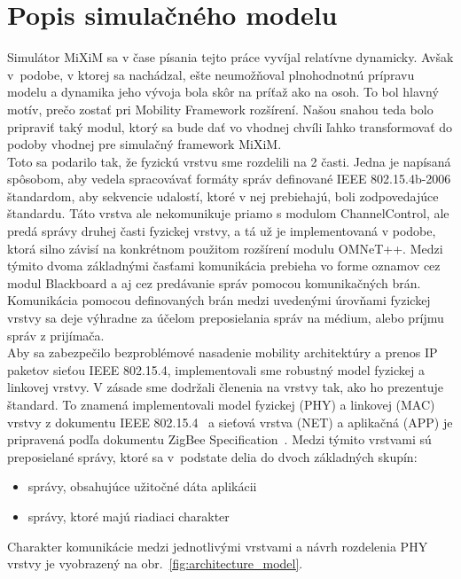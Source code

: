 \chapter{Popis simulačného modelu}
\indent\indent Simulátor MiXiM sa v čase písania tejto práce vyvíjal relatívne dynamicky. Avšak v~podobe, v ktorej sa nachádzal, ešte neumožňoval plnohodnotnú prípravu modelu a dynamika jeho vývoja bola skôr na príťaž ako na osoh. To bol hlavný motív, prečo zostať pri Mobility Framework rozšírení. Našou snahou teda bolo pripraviť taký modul, ktorý sa bude dať vo vhodnej chvíli ľahko transformovať do podoby vhodnej pre simulačný framework MiXiM.\\
\indent Toto sa podarilo tak, že fyzickú vrstvu sme rozdelili na 2 časti. Jedna je napísaná spôsobom, aby vedela spracovávať formáty správ definované IEEE 802.15.4b-2006 štandardom, aby sekvencie udalostí, ktoré v nej prebiehajú, boli zodpovedajúce štandardu. Táto vrstva ale nekomunikuje priamo s modulom \ttfamily ChannelControl\rmfamily, ale predá správy druhej časti fyzickej vrstvy, a tá už je implementovaná v podobe, ktorá silno závisí na konkrétnom použitom rozšírení modulu OMNeT++. Medzi týmito dvoma základnými časťami komunikácia prebieha vo forme oznamov cez modul \ttfamily Blackboard \rmfamily a aj cez predávanie správ pomocou komunikačných brán. Komunikácia pomocou definovaných brán medzi uvedenými úrovňami fyzickej vrstvy sa deje výhradne za účelom preposielania správ na médium, alebo príjmu správ z prijímača.\\
\indent Aby sa zabezpečilo bezproblémové nasadenie mobility architektúry a prenos IP paketov sieťou IEEE 802.15.4, implementovali sme robustný model fyzickej a linkovej vrstvy. V zásade sme dodržali členenia na vrstvy tak, ako ho prezentuje štandard. To znamená implementovali model fyzickej (PHY) a linkovej (MAC) vrstvy z dokumentu IEEE 802.15.4~\cite{ieee06} a sieťová vrstva (NET) a aplikačná (APP) je pripravená podľa dokumentu Zig\-Bee Specification~\cite{zigbee08}. Medzi týmito vrstvami sú preposielané správy, ktoré sa v~podstate delia do dvoch základných skupín:\\
\begin{itemize}
 \item správy, obsahujúce užitočné dáta aplikácii
 \item správy, ktoré majú riadiaci charakter
\end{itemize}
\indent\indent Charakter komunikácie medzi jednotlivými vrstvami a návrh rozdelenia PHY vrstvy je vyobrazený na obr.~\ref{fig:architecture_model}.\\
